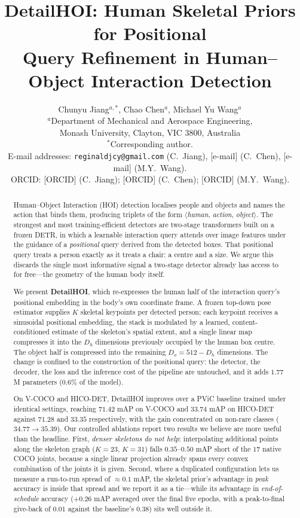 \documentclass[12pt,a4paper]{article}
\title{\bfseries DetailHOI: Human Skeletal Priors for Positional\\
Query Refinement in Human--Object Interaction Detection}
\author{%
{\large Chunyu Jiang$^{a,\ast}$, Chao Chen$^{a}$, Michael Yu Wang$^{a}$}\\[6pt]
{\normalsize $^{a}$Department of Mechanical and Aerospace Engineering,}\\
{\normalsize Monash University, Clayton, VIC 3800, Australia}\\[12pt]
{\footnotesize $^\ast$Corresponding author.}\\[2pt]
{\footnotesize E-mail addresses: \texttt{reginaldjcy@gmail.com} (C.~Jiang), [e-mail] (C.~Chen), [e-mail] (M.Y.~Wang).}\\[2pt]
{\footnotesize ORCID: [ORCID] (C.~Jiang); [ORCID] (C.~Chen); [ORCID] (M.Y.~Wang).}
}
\date{}
\begin{document}
\onehalfspacing
\maketitle
\linenumbers

\begin{abstract}
Human--Object Interaction (HOI) detection localises people and objects and names
the action that binds them, producing triplets of the form
$\langle$\emph{human}, \emph{action}, \emph{object}$\rangle$. The strongest and
most training-efficient detectors are two-stage transformers built on a frozen
DETR, in which a learnable interaction query attends over image features under
the guidance of a \emph{positional} query derived from the detected boxes. That
positional query treats a person exactly as it treats a chair: a centre and a
size. We argue this discards the single most informative signal a two-stage
detector already has access to for free---the geometry of the human body itself.

We present \textbf{DetailHOI}, which re-expresses the human half of the
interaction query's positional embedding in the body's own coordinate frame. A
frozen top-down pose estimator supplies $K$ skeletal keypoints per detected
person; each keypoint receives a sinusoidal positional embedding, the stack is
modulated by a learned, content-conditioned estimate of the skeleton's spatial
extent, and a single linear map compresses it into the $D_h$ dimensions
previously occupied by the human box centre. The object half is compressed into
the remaining $D_o = 512 - D_h$ dimensions. The change is confined to the
construction of the positional query: the detector, the decoder, the loss and
the inference cost of the pipeline are untouched, and it adds $1.77$M parameters
($0.6\%$ of the model).

On V-COCO and HICO-DET, DetailHOI improves over a PViC baseline trained under
identical settings, reaching $71.42$ mAP on V-COCO and $33.74$ mAP on HICO-DET
against $71.28$ and $33.35$ respectively, with the gain concentrated on
non-rare classes ($34.77 \rightarrow 35.39$). Our controlled ablations report
two results we believe are more useful than the headline. First,
\emph{denser skeletons do not help}: interpolating additional points along the
skeleton graph ($K = 23$, $K = 31$) falls $0.35$--$0.50$ mAP short of the $17$
native COCO joints, because a single linear projection already spans every
convex combination of the joints it is given. Second, where a duplicated
configuration lets us measure a run-to-run spread of $\approx 0.1$ mAP, the
skeletal prior's advantage in \emph{peak} accuracy is inside that spread and we
report it as a tie---while its advantage in \emph{end-of-schedule} accuracy
($+0.26$ mAP averaged over the final five epochs, with a peak-to-final give-back
of $0.01$ against the baseline's $0.38$) sits well outside it.
\end{abstract}
\end{document}
